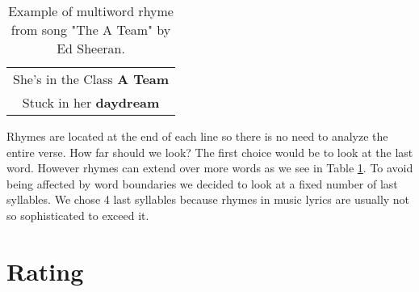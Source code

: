 \begin{table}[h!]
	\centering
	\begin{tabular}{c} 
	She's in the Class \textbf{A Team} \\
	Stuck in her \textbf{daydream} \\
	\end{tabular}
	\caption{Example of multiword rhyme from song "The A Team" by Ed Sheeran.}
	\label{multiword_rhyme_table}
\end{table}

Rhymes are located at the end of each line so there is no need to analyze the entire verse. How far should we look? The first choice would be to look at the last word. However rhymes can extend over more words as we see in Table \ref{multiword_rhyme_table}. To avoid being affected by word boundaries we decided to look at a fixed number of last syllables. We chose 4 last syllables because rhymes in music lyrics are usually not so sophisticated to exceed it.

\section{Rating}

